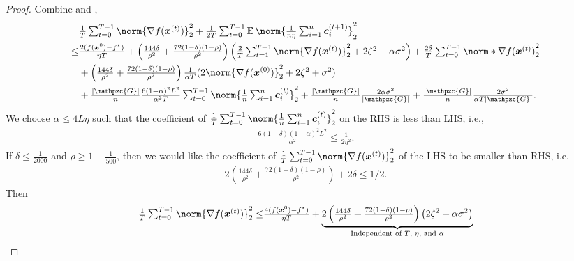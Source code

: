 \documentclass{article}
\newcommand{\gset}{\ensuremath{{\mathpzc{G}}}}
\begin{document}
\begin{proof}
  Combine  and ,
  \begin{align*}
        & \tfrac{1}{T}\tsum_{t=0}^{T-1} \norm{\nabla f(\xx^{(t)})}_2^2 + \tfrac{1}{2T}\tsum_{t=0}^{T-1} \E \norm{\tfrac{1}{n\eta} \tsum_{i=1}^n \cc_i^{(t+1)} }_2^2 \\
    \le & \tfrac{2(f(\xx^{0}) - f^\star )}{\eta T}
    + \left( \tfrac{144\delta}{\rho^2} +\tfrac{72(1-\delta)(1-\rho)}{\rho^2}\right) \left(\tfrac{2}{T}\tsum_{t=1}^{T-1} \norm{\nabla f(\xx^{(t)}) }_2^2
    +  2  \zeta^2
    + \alpha\sigma^2 \right)
    + \tfrac{2\delta}{T}\tsum_{t=0}^{T-1} \norm*{ \nabla f(\xx^{(t)}) }_2^2                                                                                         \\
        & + \left( \tfrac{144\delta}{\rho^2} +\tfrac{72(1-\delta)(1-\rho)}{\rho^2}\right) \tfrac{1}{\alpha T}(2\norm{\nabla f(\xx^{(0)}) }_2^2
    + 2 \zeta^2 + \sigma^2)                                                                                                                                         \\
        & + \tfrac{|\gset|}{n} \tfrac{6(1-\alpha)^2L^2}{\alpha^2T} \tsum_{t=0}^{T-1}
    \norm{ \tfrac{1}{n} \tsum_{i=1}^n \cc_i^{(t)} }_2^2
    + \tfrac{|\gset|}{n} \tfrac{2\alpha\sigma^2}{|\gset|} + \tfrac{|\gset|}{n} \tfrac{2\sigma^2}{ \alpha  T|\gset|}.
  \end{align*}
  We choose $\alpha\le 4L\eta$ such that the coefficient of $\tfrac{1}{T}\tsum_{t=0}^{T-1}\norm{\tfrac{1}{n}\tsum_{i=1}^n \cc_i^{(t)} }_2^2$ on the RHS is less than LHS, i.e.,
  \begin{align*}
    \tfrac{6(1-\delta)(1-\alpha)^2L^2}{\alpha^2} \le \tfrac{1}{2\eta^2}.
  \end{align*}
  If $\delta\le \tfrac{1}{2000}$ and $\rho\ge1-\tfrac{1}{500}$, then we would like the coefficient of $\tfrac{1}{T}\tsum_{t=0}^{T-1} \norm{\nabla f(\xx^{(t)})}_2^2$ of the LHS to be smaller than RHS, i.e.
  \begin{align*}
    2 \left( \tfrac{144\delta}{\rho^2} +\tfrac{72(1-\delta)(1-\rho)}{\rho^2}\right) + 2\delta \le 1/2.
  \end{align*}
  Then
  \begin{align*}
    \tfrac{1}{T}\tsum_{t=0}^{T-1} \norm{\nabla f(\xx^{(t)})}_2^2
    \le & \tfrac{4(f(\xx^{0}) - f^\star )}{\eta T}
    + \underbrace{2\left( \tfrac{144\delta}{\rho^2} +\tfrac{72(1-\delta)(1-\rho)}{\rho^2}\right) \left( 2  \zeta^2 + \alpha\sigma^2 \right)}_\text{Independent of $T$, $\eta$, and $\alpha$} \\

\end{align*}
\end{proof}
\end{document}
